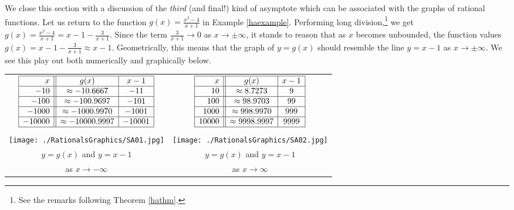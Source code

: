 We close this section with a discussion of the \textit{third} (and final!) kind of asymptote which can be associated with the graphs of rational functions. Let us return to the function $g(x) = \frac{x^2-4}{x+1}$ in Example \ref{haexample}. Performing long division,\footnote{See the remarks following Theorem \ref{hathm}.} we get $g(x) = \frac{x^2-4}{x+1} = x-1 - \frac{3}{x+1}$.  Since the term $\frac{3}{x+1} \rightarrow 0$ as $x \rightarrow \pm \infty$, it stands to reason that as $x$ becomes unbounded, the function values   $g(x) = x-1 - \frac{3}{x+1} \approx x-1$.  Geometrically, this means that the graph of $y=g(x)$ should resemble the line $y = x-1$ as $x \rightarrow \pm \infty$.  We see this play out both numerically and graphically below.

\begin{center}
\begin{tabular}{cc}

$\begin{array}{|r||c|c|}  \hline

  x & g(x) & x-1 \\ \hline
 -10 & \approx -10.6667 & -11 \\  \hline
 -100 & \approx -100.9697 & -101 \\  \hline 
 -1000 &  \approx -1000.9970&   -1001 \\ \hline 
  -10000 &  \approx -10000.9997 &  -10001 \\ \hline 
  \end{array} $ & \hspace{0.75in}

$\begin{array}{|r||c|c|}  \hline

  x & g(x) & x-1 \\ \hline
 10 & \approx 8.7273 &    9 \\\hline
 100 & \approx 98.9703 &   99 \\ \hline 
 1000 &  \approx 998.9970 &  999 \\ \hline 
  10000 &  \approx 9998.9997 &   9999 \\ \hline 
  \end{array} $ \\ 
  
  & \\
  
  \texttt{[image: ./RationalsGraphics/SA01.jpg]} & \hspace{0.75in}
  
  \texttt{[image: ./RationalsGraphics/SA02.jpg]} \\
  
   $y= g(x)$ and $y=x-1$ & \hspace{0.75in} $y = g(x)$ and $y=x-1$ \\
    as $x \rightarrow -\infty$ & \hspace{0.75in} as $x \rightarrow \infty$ \\

\end{tabular}

\end{center}

